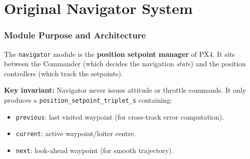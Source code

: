 \documentclass[12pt,a4paper]{article}
\begin{document}
\newpage
\part{Original Navigator System}

\section{Module Purpose and Architecture}

The \texttt{navigator} module is the \textbf{position setpoint manager} of PX4.
It sits between the Commander (which decides the navigation \emph{state}) and the
position controllers (which track the setpoints).

\begin{center}
\end{center}

\textbf{Key invariant:} Navigator never issues attitude or throttle commands.
It only produces a \texttt{position\_setpoint\_triplet\_s} containing:
\begin{itemize}
  \item \texttt{previous}: last visited waypoint (for cross-track error computation).
  \item \texttt{current}: active waypoint/loiter centre.
  \item \texttt{next}: look-ahead waypoint (for smooth trajectory).
\end{itemize}
\end{document}

